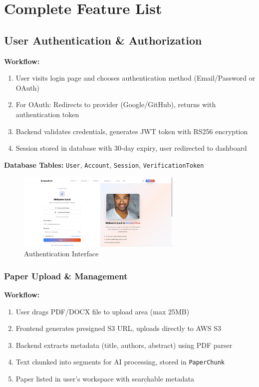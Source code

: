 \chapter{Complete Feature List}
\label{ch:features}

\section{User Authentication \& Authorization}
\label{sec:auth-features}

\textbf{Workflow:}
\begin{enumerate}[leftmargin=*,topsep=3pt,itemsep=2pt]
    \item User visits login page and chooses authentication method (Email/Password or OAuth)
    \item For OAuth: Redirects to provider (Google/GitHub), returns with authentication token
    \item Backend validates credentials, generates JWT token with RS256 encryption
    \item Session stored in database with 30-day expiry, user redirected to dashboard
\end{enumerate}

\textbf{Database Tables:} \texttt{User}, \texttt{Account}, \texttt{Session}, \texttt{VerificationToken}

\begin{figure}[H]
\centering
\includegraphics[width=0.7\textwidth]{images/screenshots/sign_in.png}
\caption{Authentication Interface}
\label{fig:auth}
\end{figure}

\subsection{Paper Upload \& Management}

\textbf{Workflow:}
\begin{enumerate}[leftmargin=*,topsep=3pt,itemsep=2pt]
    \item User drags PDF/DOCX file to upload area (max 25MB)
    \item Frontend generates presigned S3 URL, uploads directly to AWS S3
    \item Backend extracts metadata (title, authors, abstract) using PDF parser
    \item Text chunked into segments for AI processing, stored in \texttt{PaperChunk}
    \item Paper listed in user's workspace with searchable metadata
\end{enumerate}

